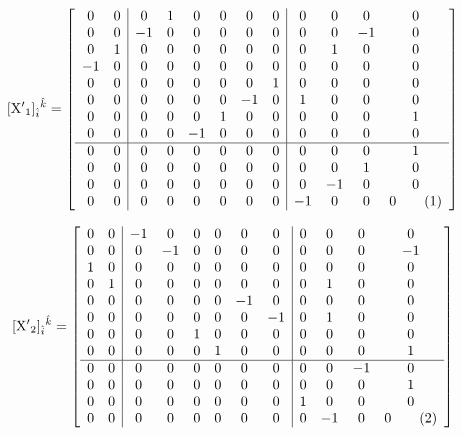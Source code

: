 \documentclass[12pt]{article}
\newcommand\numberthis{\addtocounter{equation}{1}\tag{\theequation}}
\let\bm\relax
\newcommand{\bm}[1]{{\boldsymbol{#1}}}
\begin{document}
\[[{\bm{\rm X'}_1}]_{\hat i}{}^{\hat k}= 
\left[\begin{array}{cc|cccccc|cccc}
 0 & 0 & 0 & 1 & 0 & 0 & 0 & 0 & 0 & 0 & 0 & 0 \\
 0 & 0 & -1 & 0 & 0 & 0 & 0 & 0 & 0 & 0 & -1 & 0 \\
 0 & 1 & 0 & 0 & 0 & 0 & 0 & 0 & 0 & 1 & 0 & 0 \\
 -1 & 0 & 0 & 0 & 0 & 0 & 0 & 0 & 0 & 0 & 0 & 0 \\
 0 & 0 & 0 & 0 & 0 & 0 & 0 & 1 & 0 & 0 & 0 & 0 \\
 0 & 0 & 0 & 0 & 0 & 0 & -1 & 0 & 1 & 0 & 0 & 0 \\
 0 & 0 & 0 & 0 & 0 & 1 & 0 & 0 & 0 & 0 & 0 & 1 \\
 0 & 0 & 0 & 0 & -1 & 0 & 0 & 0 & 0 & 0 & 0 & 0 \\
 \hline
 0 & 0 & 0 & 0 & 0 & 0 & 0 & 0 & 0 & 0 & 0 & 1 \\
 0 & 0 & 0 & 0 & 0 & 0 & 0 & 0 & 0 & 0 & 1 & 0 \\
 0 & 0 & 0 & 0 & 0 & 0 & 0 & 0 & 0 & -1 & 0 & 0 \\
 0 & 0 & 0 & 0 & 0 & 0 & 0 & 0 & -1 & 0 & 0 & 0 
\numberthis\end{array}\right] \]

\[[{\bm{\rm X'}_2}]_{\hat i}{}^{\hat k}= 
\left[\begin{array}{cc|cccccc|cccc}
 0 & 0 & -1 & 0 & 0 & 0 & 0 & 0 & 0 & 0 & 0 & 0 \\
 0 & 0 & 0 & -1 & 0 & 0 & 0 & 0 & 0 & 0 & 0 & -1 \\
 1 & 0 & 0 & 0 & 0 & 0 & 0 & 0 & 0 & 0 & 0 & 0 \\
 0 & 1 & 0 & 0 & 0 & 0 & 0 & 0 & 0 & 1 & 0 & 0 \\
 0 & 0 & 0 & 0 & 0 & 0 & -1 & 0 & 0 & 0 & 0 & 0 \\
 0 & 0 & 0 & 0 & 0 & 0 & 0 & -1 & 0 & 1 & 0 & 0 \\
 0 & 0 & 0 & 0 & 1 & 0 & 0 & 0 & 0 & 0 & 0 & 0 \\
 0 & 0 & 0 & 0 & 0 & 1 & 0 & 0 & 0 & 0 & 0 & 1 \\
\hline
 0 & 0 & 0 & 0 & 0 & 0 & 0 & 0 & 0 & 0 & -1 & 0 \\
 0 & 0 & 0 & 0 & 0 & 0 & 0 & 0 & 0 & 0 & 0 & 1 \\
 0 & 0 & 0 & 0 & 0 & 0 & 0 & 0 & 1 & 0 & 0 & 0 \\
 0 & 0 & 0 & 0 & 0 & 0 & 0 & 0 & 0 & -1 & 0 & 0 
\numberthis\end{array}\right] \]
\end{document}
